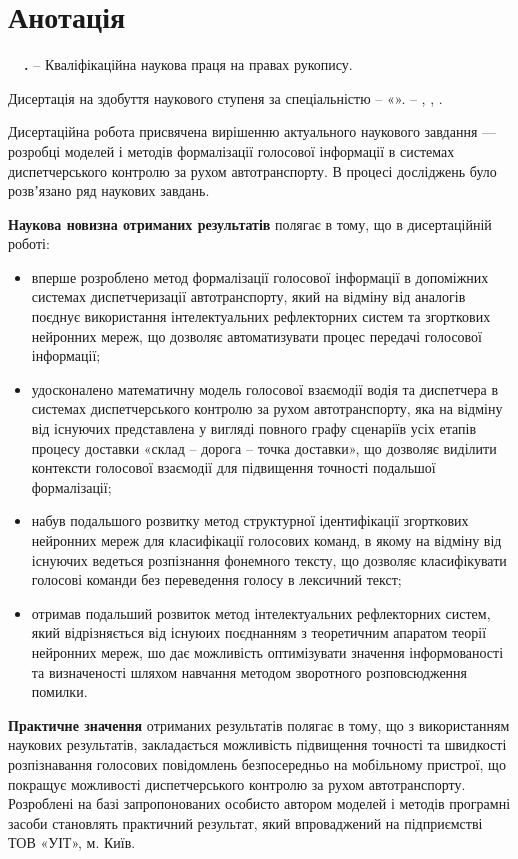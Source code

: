 \chapter*{Анотація}

\textbf{\thesisAuthorLastName~\thesisAuthorInitials\ \thesisTitle.} – Кваліфікаційна наукова праця на
правах рукопису.

Дисертація на здобуття наукового ступеня \thesisDegree за
спеціальністю \thesisSpecialtyNumber – «\thesisSpecialtyTitle». – \thesisOrganizationDone, \thesisCity, \thesisYear.

Дисертаційна робота присвячена вирішенню актуального наукового завдання --- розробці моделей і методів формалізації голосової інформації в системах диспетчерського контролю за рухом автотранспорту. В процесі досліджень було розвʼязано ряд наукових завдань.

\textbf{Наукова новизна отриманих результатів} полягає в тому, що в дисертаційній роботі:

\begin{itemize}
	\item вперше розроблено метод формалізації голосової інформації в допоміжних системах диспетчеризації автотранспорту, який на відміну від аналогів поєднує використання інтелектуальних рефлекторних систем та згорткових нейронних мереж, що дозволяє автоматизувати процес передачі голосової інформації;
	\item удосконалено математичну модель голосової взаємодії водія та диспетчера в системах диспетчерського контролю за рухом автотранспорту, яка на відміну від існуючих представлена у вигляді повного графу сценаріїв усіх етапів процесу доставки «склад – дорога – точка доставки», що дозволяє виділити контексти голосової взаємодії для підвищення точності подальшої формалізації;
	\item набув подальшого розвитку метод структурної ідентифікації згорткових нейронних мереж для класифікації голосових команд, в якому на відміну від існуючих ведеться розпізнання фонемного тексту, що дозволяє класифікувати голосові команди без переведення голосу в лексичний текст;
	\item отримав подальший розвиток метод інтелектуальних рефлекторних систем, який відрізняється від існуюих поєднанням з теоретичним апаратом теорії нейронних мереж, шо дає можливість оптимізувати значення інформованості та визначеності шляхом навчання методом зворотного розповсюдження помилки.
\end{itemize}

\textbf{Практичне значення} отриманих результатів полягає в тому, що з використанням наукових результатів, закладається можливість підвищення точності та швидкості розпізнавання голосових повідомлень безпосередньо на мобільному пристрої, що покращує можливості диспетчерського контролю за рухом автотранспорту. Розроблені на базі запропонованих особисто автором моделей і методів програмні засоби становлять практичний результат, який впроваджений на підприємстві ТОВ «УІТ», м. Київ.

